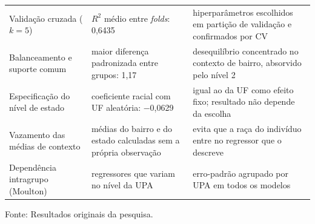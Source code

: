 \begin{table}[!ht]
\begin{tabular}{p{4.1cm}p{5.3cm}p{4.9cm}}
\addlinespace[2pt]
Validação cruzada ($k=5$) & $R^2$ médio entre \textit{folds}: 0{,}6435 & hiperparâmetros escolhidos em partição de validação e confirmados por CV \\
\addlinespace[2pt]
Balanceamento e suporte comum & maior diferença padronizada entre grupos: 1{,}17 & desequilíbrio concentrado no contexto de bairro, absorvido pelo nível 2 \\
\addlinespace[2pt]
Especificação do nível de estado & coeficiente racial com UF aleatória: −0{,}0629 & igual ao da UF como efeito fixo; resultado não depende da escolha \\
\addlinespace[2pt]
Vazamento das médias de contexto & médias do bairro e do estado calculadas sem a própria observação & evita que a raça do indivíduo entre no regressor que o descreve \\
\addlinespace[2pt]
Dependência intragrupo (Moulton) & regressores que variam no nível da UPA & erro-padrão agrupado por UPA em todos os modelos \\
\bottomrule
\end{tabular}
\par\smallskip\footnotesize Fonte: Resultados originais da pesquisa.
\end{table}
